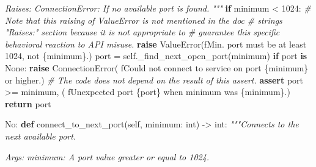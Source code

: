 \documentclass[
]{article}
\newenvironment{Shaded}{}{}
\newcommand{\BuiltInTok}[1]{\textcolor[rgb]{0.00,0.50,0.00}{#1}}
\newcommand{\CommentTok}[1]{\textcolor[rgb]{0.38,0.63,0.69}{\textit{#1}}}
\newcommand{\ControlFlowTok}[1]{\textcolor[rgb]{0.00,0.44,0.13}{\textbf{#1}}}
\newcommand{\DecValTok}[1]{\textcolor[rgb]{0.25,0.63,0.44}{#1}}
\newcommand{\KeywordTok}[1]{\textcolor[rgb]{0.00,0.44,0.13}{\textbf{#1}}}
\newcommand{\NormalTok}[1]{#1}
\newcommand{\OperatorTok}[1]{\textcolor[rgb]{0.40,0.40,0.40}{#1}}
\newcommand{\PreprocessorTok}[1]{\textcolor[rgb]{0.74,0.48,0.00}{#1}}
\newcommand{\SpecialCharTok}[1]{\textcolor[rgb]{0.25,0.44,0.63}{#1}}
\newcommand{\SpecialStringTok}[1]{\textcolor[rgb]{0.73,0.40,0.53}{#1}}
\newcommand{\VariableTok}[1]{\textcolor[rgb]{0.10,0.09,0.49}{#1}}
\begin{document}
\begin{itemize}
\begin{samepage}
\begin{Shaded}
\begin{Highlighting}[]
\CommentTok{    Raises:}
\CommentTok{      ConnectionError: If no available port is found.}
\CommentTok{    """}
    \ControlFlowTok{if}\NormalTok{ minimum }\OperatorTok{\textless{}} \DecValTok{1024}\NormalTok{:}
      \CommentTok{\# Note that this raising of ValueError is not mentioned in the doc}
      \CommentTok{\# string\textquotesingle{}s "Raises:" section because it is not appropriate to}
      \CommentTok{\# guarantee this specific behavioral reaction to API misuse.}
      \ControlFlowTok{raise} \PreprocessorTok{ValueError}\NormalTok{(}\SpecialStringTok{f\textquotesingle{}Min. port must be at least 1024, not }\SpecialCharTok{\{}\NormalTok{minimum}\SpecialCharTok{\}}\SpecialStringTok{.\textquotesingle{}}\NormalTok{)}
\NormalTok{    port }\OperatorTok{=} \VariableTok{self}\NormalTok{.\_find\_next\_open\_port(minimum)}
    \ControlFlowTok{if}\NormalTok{ port }\KeywordTok{is} \VariableTok{None}\NormalTok{:}
      \ControlFlowTok{raise} \PreprocessorTok{ConnectionError}\NormalTok{(}
          \SpecialStringTok{f\textquotesingle{}Could not connect to service on port }\SpecialCharTok{\{}\NormalTok{minimum}\SpecialCharTok{\}}\SpecialStringTok{ or higher.\textquotesingle{}}\NormalTok{)}
    \CommentTok{\# The code does not depend on the result of this assert.}
    \ControlFlowTok{assert}\NormalTok{ port }\OperatorTok{\textgreater{}=}\NormalTok{ minimum, (}
        \SpecialStringTok{f\textquotesingle{}Unexpected port }\SpecialCharTok{\{}\NormalTok{port}\SpecialCharTok{\}}\SpecialStringTok{ when minimum was }\SpecialCharTok{\{}\NormalTok{minimum}\SpecialCharTok{\}}\SpecialStringTok{.\textquotesingle{}}\NormalTok{)}
    \ControlFlowTok{return}\NormalTok{ port}
\end{Highlighting}
\end{Shaded}
\end{samepage}

\begin{samepage}
\begin{Shaded}
\begin{Highlighting}[]
\NormalTok{No:}
  \KeywordTok{def}\NormalTok{ connect\_to\_next\_port(}\VariableTok{self}\NormalTok{, minimum: }\BuiltInTok{int}\NormalTok{) }\OperatorTok{{-}\textgreater{}} \BuiltInTok{int}\NormalTok{:}
    \CommentTok{"""Connects to the next available port.}

\CommentTok{    Args:}
\CommentTok{      minimum: A port value greater or equal to 1024.}


\end{Highlighting}
\end{Shaded}
\end{samepage}
\end{itemize}
\end{document}
